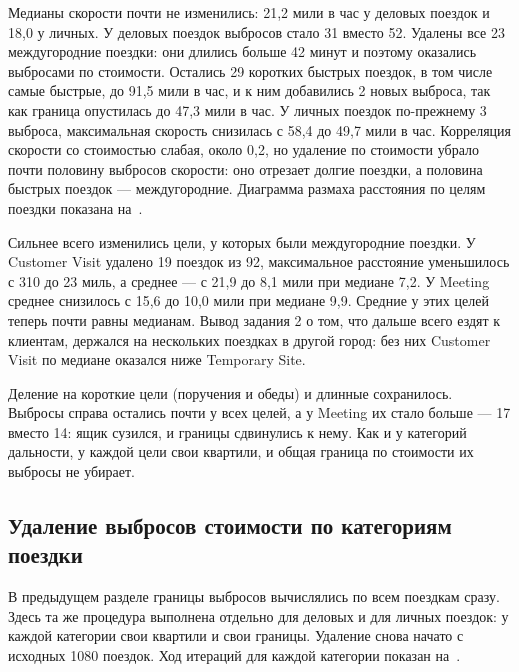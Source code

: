 \documentclass[a4paper,14pt]{extarticle}
\begin{document}

Медианы скорости почти не изменились: 21,2 мили в час у деловых поездок и 18,0 у личных. У деловых поездок выбросов стало 31 вместо 52. Удалены все 23 междугородние поездки: они длились больше 42 минут и поэтому оказались выбросами по стоимости. Остались 29 коротких быстрых поездок, в том числе самые быстрые, до 91,5 мили в час, и к ним добавились 2 новых выброса, так как граница опустилась до 47,3 мили в час. У личных поездок по-прежнему 3 выброса, максимальная скорость снизилась с 58,4 до 49,7 мили в час. Корреляция скорости со стоимостью слабая, около 0,2, но удаление по стоимости убрало почти половину выбросов скорости: оно отрезает долгие поездки, а половина быстрых поездок — междугородние. Диаграмма размаха расстояния по целям поездки показана на~.


Сильнее всего изменились цели, у которых были междугородние поездки. У Customer Visit удалено 19 поездок из 92, максимальное расстояние уменьшилось с 310 до 23 миль, а среднее — с 21,9 до 8,1 мили при медиане 7,2. У Meeting среднее снизилось с 15,6 до 10,0 мили при медиане 9,9. Средние у этих целей теперь почти равны медианам. Вывод задания 2 о том, что дальше всего ездят к клиентам, держался на нескольких поездках в другой город: без них Customer Visit по медиане оказался ниже Temporary Site.

Деление на короткие цели (поручения и обеды) и длинные сохранилось. Выбросы справа остались почти у всех целей, а у Meeting их стало больше — 17 вместо 14: ящик сузился, и границы сдвинулись к нему. Как и у категорий дальности, у каждой цели свои квартили, и общая граница по стоимости их выбросы не убирает.

\subsection{Удаление выбросов стоимости по категориям поездки}

В предыдущем разделе границы выбросов вычислялись по всем поездкам сразу. Здесь та же процедура выполнена отдельно для деловых и для личных поездок: у каждой категории свои квартили и свои границы. Удаление снова начато с исходных 1080 поездок. Ход итераций для каждой категории показан на~.
\end{document}
